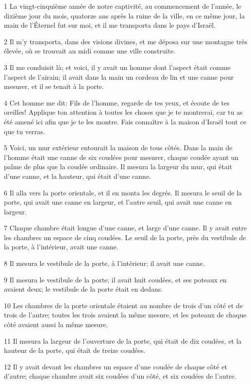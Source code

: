 \par 1 La vingt-cinquième année de notre captivité, au commencement de l'année, le dixième jour du mois, quatorze ans après la ruine de la ville, en ce même jour, la main de l'Éternel fut sur moi, et il me transporta dans le pays d'Israël.
\par 2 Il m'y transporta, dans des visions divines, et me déposa sur une montagne très élevée, où se trouvait au midi comme une ville construite.
\par 3 Il me conduisit là; et voici, il y avait un homme dont l'aspect était comme l'aspect de l'airain; il avait dans la main un cordeau de lin et une canne pour mesurer, et il se tenait à la porte.
\par 4 Cet homme me dit: Fils de l'homme, regarde de tes yeux, et écoute de tes oreilles! Applique ton attention à toutes les choses que je te montrerai, car tu as été amené ici afin que je te les montre. Fais connaître à la maison d'Israël tout ce que tu verras.
\par 5 Voici, un mur extérieur entourait la maison de tous côtés. Dans la main de l'homme était une canne de six coudées pour mesurer, chaque coudée ayant un palme de plus que la coudée ordinaire. Il mesura la largeur du mur, qui était d'une canne, et la hauteur, qui était d'une canne.
\par 6 Il alla vers la porte orientale, et il en monta les degrés. Il mesura le seuil de la porte, qui avait une canne en largeur, et l'autre seuil, qui avait une canne en largeur.
\par 7 Chaque chambre était longue d'une canne, et large d'une canne. Il y avait entre les chambres un espace de cinq coudées. Le seuil de la porte, près du vestibule de la porte, à l'intérieur, avait une canne.
\par 8 Il mesura le vestibule de la porte, à l'intérieur; il avait une canne.
\par 9 Il mesura le vestibule de la porte; il avait huit coudées, et ses poteaux en avaient deux; le vestibule de la porte était en dedans.
\par 10 Les chambres de la porte orientale étaient au nombre de trois d'un côté et de trois de l'autre; toutes les trois avaient la même mesure, et les poteaux de chaque côté avaient aussi la même mesure.
\par 11 Il mesura la largeur de l'ouverture de la porte, qui était de dix coudées, et la hauteur de la porte, qui était de treize coudées.
\par 12 Il y avait devant les chambres un espace d'une coudée de chaque côté et d'autre; chaque chambre avait six coudées d'un côté, et six coudées de l'autre.
